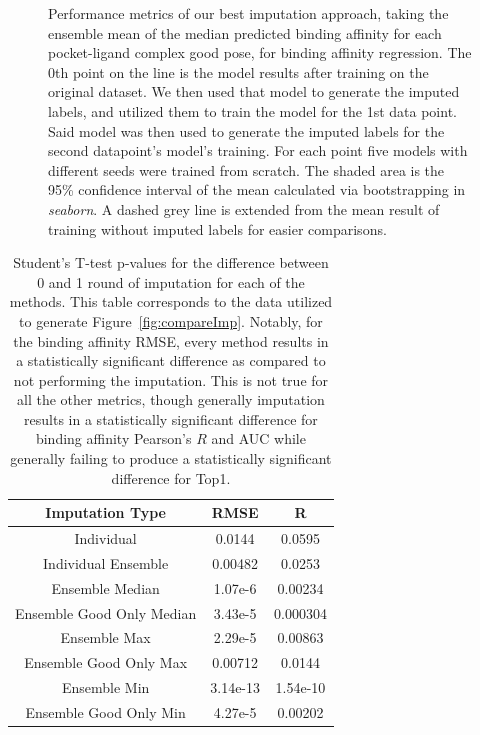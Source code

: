 \documentclass[journal=jcim,manuscript=article]{achemso}
\begin{document}
\begin{figure}[tbph]
    \caption{Performance metrics of our best imputation approach, taking the ensemble mean of the median predicted binding affinity for each pocket-ligand complex good pose, for binding affinity regression. The 0th point on the line is the model results after training on the original dataset. We then used that model to generate the imputed labels, and utilized them to train the model for the 1st data point. Said model was then used to generate the imputed labels for the second datapoint's model's training. For each point five models with different seeds were trained from scratch. The shaded area is the 95\% confidence interval of the mean calculated via bootstrapping in \textit{seaborn}.  A dashed grey line is extended from the mean result of training without imputed labels for easier comparisons.}
    \label{fig:medGOEnsOverall}
\end{figure}

\begin{table}
    \centering
    \begin{tabular}{c|c|c}
    Imputation Type & RMSE & R  \\
    \hline
    Individual & 0.0144 & 0.0595  \\
    Individual  Ensemble & 0.00482 & 0.0253  \\
    Ensemble Median & 1.07e-6 & 0.00234  \\
    Ensemble Good Only Median & 3.43e-5 & 0.000304  \\
    Ensemble Max & 2.29e-5 & 0.00863  \\
    Ensemble Good Only Max & 0.00712 & 0.0144  \\
    Ensemble Min & 3.14e-13 & 1.54e-10  \\
    Ensemble Good Only Min & 4.27e-5 & 0.00202  \\
    \end{tabular}
    \caption{Student's T-test p-values for the difference between 0 and 1 round of imputation for each of the methods. This table corresponds to the data utilized to generate Figure~\ref{fig:compareImp}. Notably, for the binding affinity RMSE, every method results in a statistically significant difference as compared to not performing the imputation. This is not true for all the other metrics, though generally imputation results in a statistically significant difference for binding affinity Pearson's $R$ and AUC while generally failing to produce a statistically significant difference for Top1.}
    \label{tab:ImpTypeSignificance}
\end{table}
\end{document}
